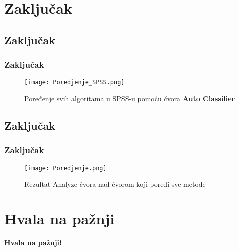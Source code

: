 \documentclass{beamer}
\begin{document}
\section{Zaključak}
\subsection*{Zaključak}
\begin{frame}[fragile]
\frametitle{Zaključak}

\begin{figure}[ht!]
    \centering
    \texttt{[image: Poredjenje\_SPSS.png]}
    \caption{Poređenje svih algoritama u SPSS-u pomoću čvora \textbf{Auto Classifier}}
    \label{fig:Poredjenje_SPSS}
\end{figure}
\end{frame}

\subsection*{Zaključak}
\begin{frame}[fragile]
\frametitle{Zaključak}
\begin{figure}[ht!]
    \centering
    \texttt{[image: Poredjenje.png]}
    \caption{Rezultat Analyze čvora nad čvorom koji poredi sve metode}
    \label{fig:PoredjenjeTabela}
\end{figure}
\end{frame}

\section{Hvala na pažnji}
\begin{frame}{}
 \begin{center}
 	\textbf {Hvala na pažnji!}
 \end{center}
\end{frame}
\end{document}
